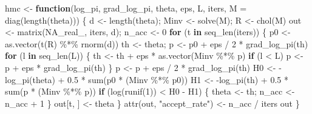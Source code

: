 \documentclass[
  letterpaper,
  DIV=11,
  numbers=noendperiod]{scrreprt}
\newenvironment{Shaded}{\begin{snugshade}}{\end{snugshade}}
\newcommand{\AttributeTok}[1]{\textcolor[rgb]{0.40,0.45,0.13}{#1}}
\newcommand{\ConstantTok}[1]{\textcolor[rgb]{0.56,0.35,0.01}{#1}}
\newcommand{\ControlFlowTok}[1]{\textcolor[rgb]{0.00,0.23,0.31}{\textbf{#1}}}
\newcommand{\DecValTok}[1]{\textcolor[rgb]{0.68,0.00,0.00}{#1}}
\newcommand{\FloatTok}[1]{\textcolor[rgb]{0.68,0.00,0.00}{#1}}
\newcommand{\FunctionTok}[1]{\textcolor[rgb]{0.28,0.35,0.67}{#1}}
\newcommand{\NormalTok}[1]{\textcolor[rgb]{0.00,0.23,0.31}{#1}}
\newcommand{\OtherTok}[1]{\textcolor[rgb]{0.00,0.23,0.31}{#1}}
\newcommand{\SpecialCharTok}[1]{\textcolor[rgb]{0.37,0.37,0.37}{#1}}
\newcommand{\StringTok}[1]{\textcolor[rgb]{0.13,0.47,0.30}{#1}}
\begin{document}
\begin{Shaded}
\begin{Highlighting}[]
\NormalTok{hmc }\OtherTok{\textless{}{-}} \ControlFlowTok{function}\NormalTok{(log\_pi, grad\_log\_pi, theta, eps, L, iters, }\AttributeTok{M =} \FunctionTok{diag}\NormalTok{(}\FunctionTok{length}\NormalTok{(theta))) \{}
\NormalTok{    d }\OtherTok{\textless{}{-}} \FunctionTok{length}\NormalTok{(theta); Minv }\OtherTok{\textless{}{-}} \FunctionTok{solve}\NormalTok{(M); R }\OtherTok{\textless{}{-}} \FunctionTok{chol}\NormalTok{(M)}
\NormalTok{    out }\OtherTok{\textless{}{-}} \FunctionTok{matrix}\NormalTok{(}\ConstantTok{NA\_real\_}\NormalTok{, iters, d); n\_acc }\OtherTok{\textless{}{-}} \DecValTok{0}
    \ControlFlowTok{for}\NormalTok{ (t }\ControlFlowTok{in} \FunctionTok{seq\_len}\NormalTok{(iters)) \{}
\NormalTok{        p0 }\OtherTok{\textless{}{-}} \FunctionTok{as.vector}\NormalTok{(}\FunctionTok{t}\NormalTok{(R) }\SpecialCharTok{\%*\%} \FunctionTok{rnorm}\NormalTok{(d))}
\NormalTok{        th }\OtherTok{\textless{}{-}}\NormalTok{ theta; p }\OtherTok{\textless{}{-}}\NormalTok{ p0 }\SpecialCharTok{+}\NormalTok{ eps }\SpecialCharTok{/} \DecValTok{2} \SpecialCharTok{*} \FunctionTok{grad\_log\_pi}\NormalTok{(th)}
        \ControlFlowTok{for}\NormalTok{ (l }\ControlFlowTok{in} \FunctionTok{seq\_len}\NormalTok{(L)) \{}
\NormalTok{            th }\OtherTok{\textless{}{-}}\NormalTok{ th }\SpecialCharTok{+}\NormalTok{ eps }\SpecialCharTok{*} \FunctionTok{as.vector}\NormalTok{(Minv }\SpecialCharTok{\%*\%}\NormalTok{ p)}
            \ControlFlowTok{if}\NormalTok{ (l }\SpecialCharTok{\textless{}}\NormalTok{ L) p }\OtherTok{\textless{}{-}}\NormalTok{ p }\SpecialCharTok{+}\NormalTok{ eps }\SpecialCharTok{*} \FunctionTok{grad\_log\_pi}\NormalTok{(th)}
\NormalTok{        \}}
\NormalTok{        p }\OtherTok{\textless{}{-}}\NormalTok{ p }\SpecialCharTok{+}\NormalTok{ eps }\SpecialCharTok{/} \DecValTok{2} \SpecialCharTok{*} \FunctionTok{grad\_log\_pi}\NormalTok{(th)}
\NormalTok{        H0 }\OtherTok{\textless{}{-}} \SpecialCharTok{{-}}\FunctionTok{log\_pi}\NormalTok{(theta) }\SpecialCharTok{+} \FloatTok{0.5} \SpecialCharTok{*} \FunctionTok{sum}\NormalTok{(p0 }\SpecialCharTok{*}\NormalTok{ (Minv }\SpecialCharTok{\%*\%}\NormalTok{ p0))}
\NormalTok{        H1 }\OtherTok{\textless{}{-}} \SpecialCharTok{{-}}\FunctionTok{log\_pi}\NormalTok{(th)    }\SpecialCharTok{+} \FloatTok{0.5} \SpecialCharTok{*} \FunctionTok{sum}\NormalTok{(p  }\SpecialCharTok{*}\NormalTok{ (Minv }\SpecialCharTok{\%*\%}\NormalTok{ p))}
        \ControlFlowTok{if}\NormalTok{ (}\FunctionTok{log}\NormalTok{(}\FunctionTok{runif}\NormalTok{(}\DecValTok{1}\NormalTok{)) }\SpecialCharTok{\textless{}}\NormalTok{ H0 }\SpecialCharTok{{-}}\NormalTok{ H1) \{ theta }\OtherTok{\textless{}{-}}\NormalTok{ th; n\_acc }\OtherTok{\textless{}{-}}\NormalTok{ n\_acc }\SpecialCharTok{+} \DecValTok{1}\NormalTok{ \}}
\NormalTok{        out[t, ] }\OtherTok{\textless{}{-}}\NormalTok{ theta}
\NormalTok{    \}}
    \FunctionTok{attr}\NormalTok{(out, }\StringTok{"accept\_rate"}\NormalTok{) }\OtherTok{\textless{}{-}}\NormalTok{ n\_acc }\SpecialCharTok{/}\NormalTok{ iters}
\NormalTok{    out}
\NormalTok{\}}
\end{Highlighting}
\end{Shaded}
\end{document}

